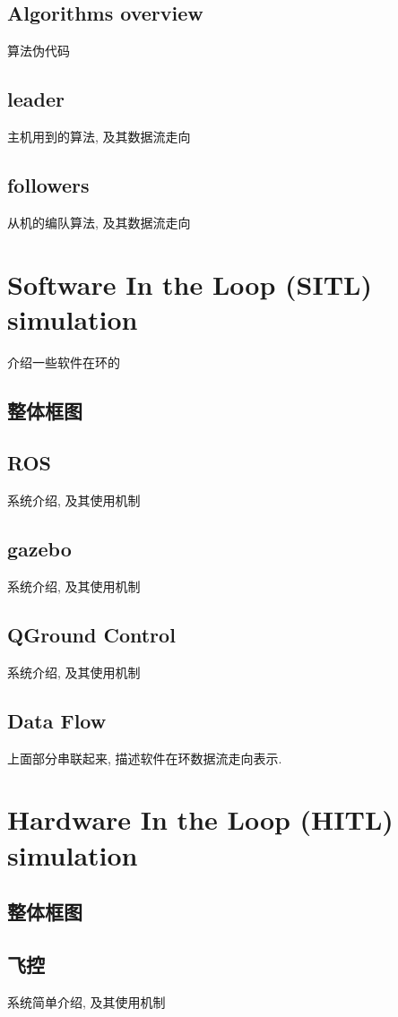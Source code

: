 \documentclass[UTF8,a4paper,10pt,nocolorlinks]{ctexart}
\begin{document}
        \subsection{Algorithms overview}
            算法伪代码
        \subsection{leader}
            主机用到的算法, 及其数据流走向
        \subsection{followers}
            从机的编队算法, 及其数据流走向

    \clearpage
    \section{Software In the Loop (SITL) simulation}
        介绍一些软件在环的
        \subsection{整体框图}
        \subsection{ROS}
            系统介绍, 及其使用机制
        \subsection{gazebo}
            系统介绍, 及其使用机制
        \subsection{QGround Control}
            系统介绍, 及其使用机制
        \subsection{Data Flow}
            上面部分串联起来, 描述软件在环数据流走向表示.
    \clearpage   
    \section{Hardware In the Loop (HITL) simulation}
    \subsection{整体框图}
        \subsection{飞控}
        系统简单介绍, 及其使用机制
\end{document}
